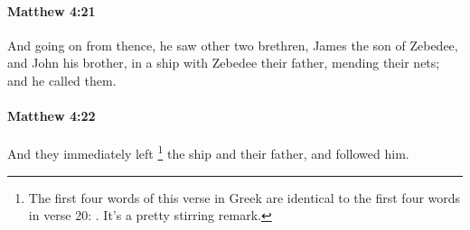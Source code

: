 		\paragraph{Matthew 4:21} %
			\label{MATTHEW-4-21}

			And going on from thence, he saw other two brethren, James the son of Zebedee, and John his brother, in a ship with Zebedee their father, mending their nets; and he called them.

			\begin{framed}
			\scriptsize
				\begin{compactdesc}
					\item[SBLG] 
				\end{compactdesc}
			\end{framed}

		\paragraph{Matthew 4:22} %
			\label{MATTHEW-4-22}

			And they immediately left%
				\footnote{%
					The first four words of this verse in Greek are identical to the first four words in verse 20: . It's a pretty stirring remark.
					}
			the ship and their father, and followed him.

